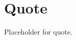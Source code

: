 \chapter{Quote}
\label{sec:quote}

Placeholder for quote.

\begin{comment}

“Of all the forces of nature, I should think the wind contains the largest amount of motive power -- that is, power to move things. Take any given space of the earth's surface- for instance, Illinois and all the power exerted by all the men, and beasts, and running-water, and steam, over and upon it, shall not equal the one hundredth part of what is exerted by the blowing of the wind over and upon the same space. And yet it has not, so far in the world's history, become proportionably valuable as a motive power. It is applied extensively, and advantageously, to sail-vessels in navigation. Add to this a few wind-mills, and pumps, and you have about all. That, as yet, no very successful mode of controlling, and directing the wind, has been discovered; and that, naturally, it moves by fits and starts -- now so gently as to scarcely stir a leaf, and now so roughly as to level a forest- doubtless have been the insurmountable difficulties. As yet, the wind is an untamed, and unharnessed force; and quite possibly one of the greatest discoveries hereafter to be made, will be the taming, and harnessing of the wind. That the difficulties of controlling this power are very great is quite evident by the fact that they have already been perceived, and struggled with more than three thousand years; for that power was applied to sail-vessels, at least as early as the time of the prophet Isaiah.
Abraham Lincoln (1860) 

http://www.abrahamlincolnonline.org/lincoln/speeches/discoveries.htm

\end{comment}